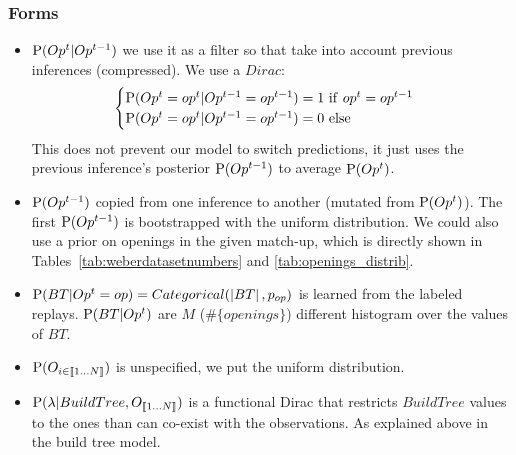 \subsubsection{Forms}
\begin{itemize}
\item $\mathrm{P}(Op^t | Op^{t-1})$ we use it as a filter so that take into account previous inferences (compressed). 
We use a $Dirac$:
\begin{eqnarray*}
\begin{cases}
\mathrm{P}(Op^t=op^t|Op^{t-1}=op^{t-1}) = 1\ \mathrm{if}\ op^t = op^{t-1}\\
\mathrm{P}(Op^t=op^t|Op^{t-1}=op^{t-1}) = 0\ \mathrm{else}
\end{cases}
\end{eqnarray*}
This does not prevent our model to switch predictions, it just uses the previous inference's posterior $\mathrm{P}(Op^{t-1})$ to average $\mathrm{P}(Op^t)$.

\item $\mathrm{P}(Op^{t-1})$ copied from one inference to another (mutated from $\mathrm{P}(Op^t)$). The first $\mathrm{P}(Op^{t-1})$ is bootstrapped with the uniform distribution. We could also use a prior on openings in the given match-up, which is directly shown in Tables~\ref{tab:weberdatasetnumbers} and \ref{tab:openings_distrib}.

\item $\mathrm{P}(BT | Op^t=op)=Categorical(\left\lvert BT\right\rvert,p_{op})$ is learned from the labeled replays. $\mathrm{P}(BT|Op^t)$ are $M$ ($\#\{openings\}$) different histogram over the values of $BT$.
\item $\mathrm{P}(O_{i \in \llbracket 1 \dots N\rrbracket})$ is unspecified, we put the uniform distribution.
\item $\mathrm{P}(\lambda | BuildTree, O_{\llbracket 1 \dots N\rrbracket})$ is a functional Dirac that restricts $BuildTree$ values to the ones than can co-exist with the observations. As explained above in the build tree model.


\end{itemize}
